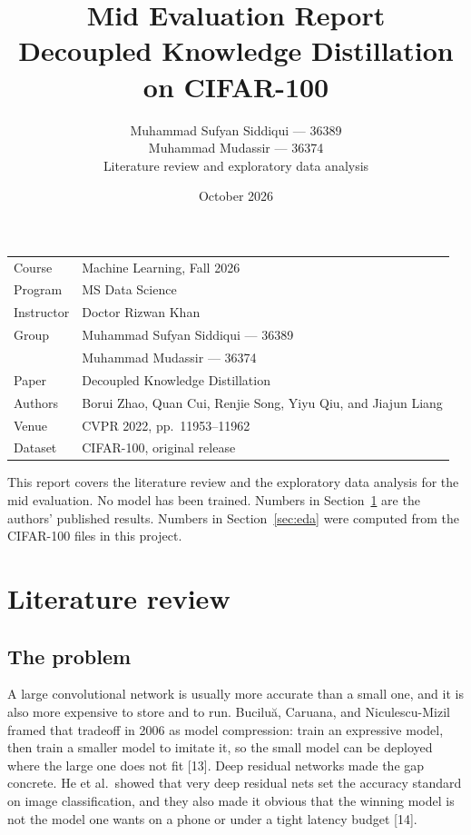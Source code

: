 \documentclass[11pt]{article}
\title{Mid Evaluation Report\\[0.4em]
\large Decoupled Knowledge Distillation on CIFAR-100}
\author{Muhammad Sufyan Siddiqui --- 36389\\
Muhammad Mudassir --- 36374\\[0.35em]
\normalsize Literature review and exploratory data analysis}
\date{October 2026}
\begin{document}
\maketitle

\begin{center}
\begin{tabular}{@{}ll@{}}
Course & Machine Learning, Fall 2026 \\
Program & MS Data Science \\
Instructor & Doctor Rizwan Khan \\
Group & Muhammad Sufyan Siddiqui --- 36389 \\
 & Muhammad Mudassir --- 36374 \\
Paper & Decoupled Knowledge Distillation \\
Authors & Borui Zhao, Quan Cui, Renjie Song, Yiyu Qiu, and Jiajun Liang \\
Venue & CVPR 2022, pp.\ 11953--11962 \\
Dataset & CIFAR-100, original release \\
\end{tabular}
\end{center}

\vspace{0.6em}
\noindent
This report covers the literature review and the exploratory data analysis for the mid evaluation. No model has been trained. Numbers in Section~\ref{sec:lit} are the authors' published results. Numbers in Section~\ref{sec:eda} were computed from the CIFAR-100 files in this project.

\section{Literature review}
\label{sec:lit}

\subsection{The problem}

A large convolutional network is usually more accurate than a small one, and it is also more expensive to store and to run. Bucilu\u{a}, Caruana, and Niculescu-Mizil framed that tradeoff in 2006 as model compression: train an expressive model, then train a smaller model to imitate it, so the small model can be deployed where the large one does not fit [13]. Deep residual networks made the gap concrete. He et al.\ showed that very deep residual nets set the accuracy standard on image classification, and they also made it obvious that the winning model is not the model one wants on a phone or under a tight latency budget [14].
\end{document}
